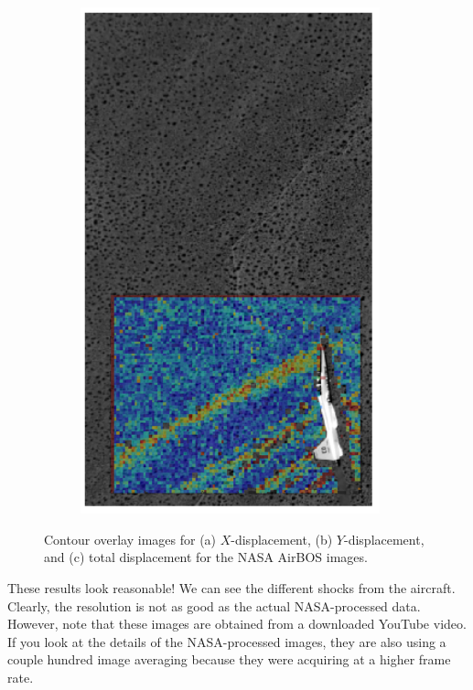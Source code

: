 \documentclass[letterpaper,12pt]{article}
\begin{document}
\begin{figure}[h]
\begin{subfigure}[b]{0.3\textwidth}
        \includegraphics[width=0.95\textwidth]{AirBOS_Total_Displacement.PNG}
        \caption{}
        \label{fig:AirBOS_Total_Displacement}
    \end{subfigure}
 	
    \caption{Contour overlay images for (a) $X$-displacement, (b) $Y$-displacement, and (c) total displacement for the NASA AirBOS images.}
    \label{fig:AirBOS_Displacement}
\end{figure}

These results look reasonable!  We can see the different shocks from the aircraft.  Clearly, the resolution is not as good as the actual NASA-processed data.  However, note that these images are obtained from a downloaded YouTube video.  If you look at the details of the NASA-processed images, they are also using a couple hundred image averaging because they were acquiring at a higher frame rate.
\end{document}
